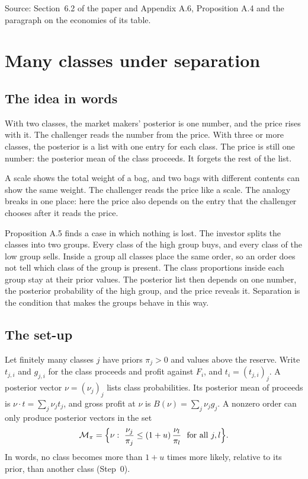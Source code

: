 {\small\color{notegrey}Source: Section~6.2 of the paper and Appendix A.6, Proposition A.4 and the paragraph on the economies of its table.}

\section{Many classes under separation}\label{sec:robustness-many}

\subsection{The idea in words}

With two classes, the market makers' posterior is one number, and the price rises with it.
The challenger reads the number from the price.
With three or more classes, the posterior is a list with one entry for each class.
The price is still one number: the posterior mean of the class proceeds.
It forgets the rest of the list.

\begin{analogy}[a scale]
A scale shows the total weight of a bag, and two bags with different contents can show the same weight.
The challenger reads the price like a scale.
The analogy breaks in one place: here the price also depends on the entry that the challenger chooses after it reads the price.
\end{analogy}

Proposition A.5 finds a case in which nothing is lost.
The investor splits the classes into two groups.
Every class of the high group buys, and every class of the low group sells.
Inside a group all classes place the same order, so an order does not tell which class of the group is present.
The class proportions inside each group stay at their prior values.
The posterior list then depends on one number, the posterior probability of the high group, and the price reveals it.
Separation is the condition that makes the groups behave in this way.

\subsection{The set-up}

Let finitely many classes \(j\) have priors \(\pi_j>0\) and values above the reserve.
Write \(t_{j,i}\) and \(g_{j,i}\) for the class proceeds and profit against \(F_i\), and \(t_i=(t_{j,i})_j\).
A posterior vector \(\nu=(\nu_j)_j\) lists class probabilities.
Its posterior mean of proceeds is \(\nu\cdot t=\sum_j\nu_jt_j\), and gross profit at \(\nu\) is \(B(\nu)=\sum_j\nu_jg_j\).
A nonzero order can only produce posterior vectors in the set
\[
\mathcal M_\pi=\Bigl\{\nu:\ \frac{\nu_j}{\pi_j}\le(1+u)\,\frac{\nu_l}{\pi_l}\ \text{ for all }j,l\Bigr\}.
\]
In words, no class becomes more than \(1+u\) times more likely, relative to its prior, than another class (Step~0).

